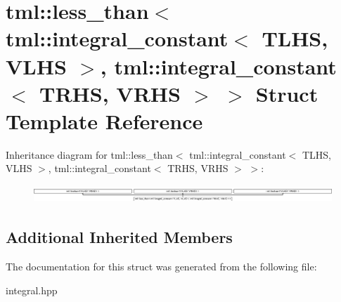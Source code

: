 \hypertarget{structtml_1_1less__than_3_01tml_1_1integral__constant_3_01TLHS_00_01VLHS_01_4_00_01tml_1_1integr73d48bd533ce18c7352e341c8afd53db}{\section{tml\+:\+:less\+\_\+than$<$ tml\+:\+:integral\+\_\+constant$<$ T\+L\+H\+S, V\+L\+H\+S $>$, tml\+:\+:integral\+\_\+constant$<$ T\+R\+H\+S, V\+R\+H\+S $>$ $>$ Struct Template Reference}
\label{structtml_1_1less__than_3_01tml_1_1integral__constant_3_01TLHS_00_01VLHS_01_4_00_01tml_1_1integr73d48bd533ce18c7352e341c8afd53db}
}
Inheritance diagram for tml\+:\+:less\+\_\+than$<$ tml\+:\+:integral\+\_\+constant$<$ T\+L\+H\+S, V\+L\+H\+S $>$, tml\+:\+:integral\+\_\+constant$<$ T\+R\+H\+S, V\+R\+H\+S $>$ $>$\+:\begin{figure}[H]
\begin{center}
\leavevmode
\includegraphics[height=0.670257cm]{structtml_1_1less__than_3_01tml_1_1integral__constant_3_01TLHS_00_01VLHS_01_4_00_01tml_1_1integr73d48bd533ce18c7352e341c8afd53db}
\end{center}
\end{figure}
\subsection*{Additional Inherited Members}


The documentation for this struct was generated from the following file\+:\begin{DoxyCompactItemize}
\item 
integral.\+hpp\end{DoxyCompactItemize}
